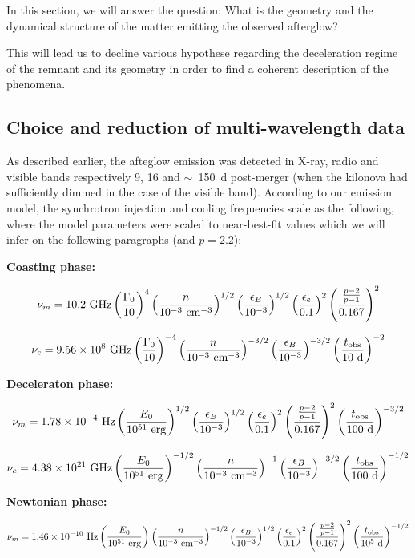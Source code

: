 In this section, we will answer the question: What is the geometry and the dynamical structure of the matter emitting the observed afterglow?

This will lead us to decline various hypothese regarding the deceleration regime of the remnant and its geometry in order to find a coherent description of the phenomena.

\subsection{Choice and reduction of multi-wavelength data}
As described earlier, the afteglow emission was detected in X-ray, radio and visible bands respectively 9, 16 and $\sim$~150~d post-merger (when the kilonova had sufficiently dimmed in the case of the visible band). According to our emission model, the synchrotron injection and cooling frequencies scale as the following, where the model parameters were scaled to near-best-fit values which we will infer on the following paragraphs (and $p = 2.2$):

\bf{Coasting phase:}

$$\nu_m = 10.2~\rm{GHz} \left(\frac{\Gamma_0}{10} \right)^{4} \left(\frac{n}{10^{-3}~\rm{cm}^{-3}} \right)^{1/2} \left(\frac{\epsilon_B}{10^{-3}} \right)^{1/2} \left(\frac{\epsilon_e}{0.1} \right)^{2} \left(\frac{\frac{p - 2}{p - 1}}{0.167} \right)^{2}$$


$$\nu_c = 9.56 \times 10^8~\rm{GHz} \left(\frac{\Gamma_0}{10} \right)^{-4} \left(\frac{n}{10^{-3}~\rm{cm}^{-3}} \right)^{-3/2} \left(\frac{\epsilon_B}{10^{-3}} \right)^{-3/2}  \left(\frac{t_{\rm{obs}}}{10~\rm{d}} \right)^{-2}$$


\bf{Deceleraton phase:}

$$\nu_m = 1.78 \times 10^{-4}~\rm{Hz} \left(\frac{E_0}{10^{51}~\rm{erg}} \right)^{1/2}  \left(\frac{\epsilon_B}{10^{-3}} \right)^{1/2} \left(\frac{\epsilon_e}{0.1} \right)^{2} \left(\frac{\frac{p - 2}{p - 1}}{0.167} \right)^{2} \left(\frac{t_{\rm{obs}}}{100~\rm{d}} \right)^{-3/2} $$


$$\nu_c = 4.38 \times 10^{21}~\rm{GHz} \left(\frac{E_0}{10^{51}~\rm{erg}} \right)^{-1/2} \left(\frac{n}{10^{-3}~\rm{cm}^{-3}} \right)^{-1} \left(\frac{\epsilon_B}{10^{-3}} \right)^{-3/2} \left(\frac{t_{\rm{obs}}}{100~\rm{d}} \right)^{-1/2}$$


\bf{Newtonian phase:}

$$\nu_m = 1.46 \times 10^{-10}~\rm{Hz} \left(\frac{E_0}{10^{51}~\rm{erg}} \right)^{} \left(\frac{n}{10^{-3}~\rm{cm}^{-3}} \right)^{-1/2} \left(\frac{\epsilon_B}{10^{-3}} \right)^{1/2} \left(\frac{\epsilon_e}{0.1} \right)^{2} \left(\frac{\frac{p - 2}{p - 1}}{0.167} \right)^{2} \left(\frac{t_{\rm{obs}}}{10^5~\rm{d}} \right)^{-1/2} $$

